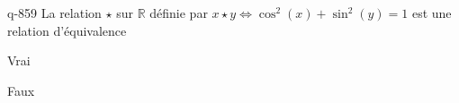 \begin{truefalse}{q-859}
La relation $\star$ sur $\mathbb R$ définie par $x\star y \iff \cos^2(x)+\sin^2(y)=1$ est une relation d'équivalence
\item* Vrai
\item Faux
\end{truefalse}

